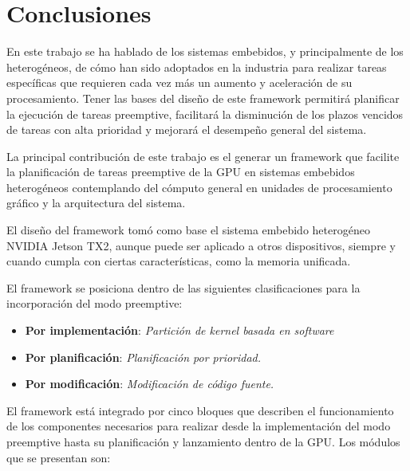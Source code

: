 \chapter{Conclusiones}
    \label{cha:Conclusiones}
    
En este trabajo se ha hablado de los sistemas embebidos, y principalmente de los heterogéneos, de cómo han sido adoptados en la industria para realizar tareas específicas que requieren cada vez más un aumento y aceleración de su procesamiento.
Tener las bases del diseño de este framework permitirá planificar la ejecución de tareas preemptive, facilitará la disminución de los plazos vencidos de tareas con alta prioridad y mejorará el desempeño general del sistema.
\newline

La principal contribución de este trabajo es el generar un framework que facilite la planificación de tareas preemptive de la GPU en sistemas embebidos heterogéneos contemplando del cómputo general en unidades de procesamiento gráfico y la arquitectura del sistema.
\newline

El diseño del framework tomó como base el sistema embebido heterogéneo NVIDIA Jetson TX2, aunque puede ser aplicado a otros dispositivos, siempre y cuando cumpla con ciertas características, como la memoria unificada.
\newline

El framework se posiciona dentro de las siguientes clasificaciones para la incorporación del modo preemptive:
\begin{itemize}
    \item \textbf{Por implementación}: \textit{Partición de kernel basada en software}
    \item \textbf{Por planificación}: \textit{Planificación por prioridad.}
    \item \textbf{Por modificación}: \textit{Modificación de código fuente.}
\end{itemize}
    
El framework está integrado por cinco bloques que describen el funcionamiento de los componentes necesarios para realizar desde la implementación del modo preemptive hasta su planificación y lanzamiento dentro de la GPU. 
Los módulos que se presentan son:

